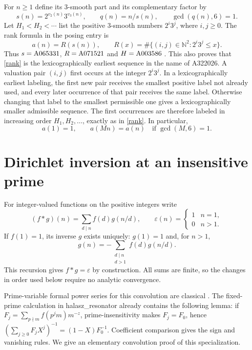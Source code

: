 \documentclass[11pt]{article}
\newcommand{\A}[1]{\textnormal{A#1}}
\newcommand{\N}{\mathbb N}
\begin{document}
For $n\geq1$ define its $3$-smooth part and its complementary factor by
\[
 s(n)=2^{v_2(n)}3^{v_3(n)},\qquad q(n)=n/s(n),\qquad \gcd(q(n),6)=1.
\]
Let $H_1<H_2<\cdots$ list the positive $3$-smooth numbers $2^i3^j$,
where $i,j\geq0$. The rank formula in the posing entry is
\begin{equation}\label{rank}
 a(n)=R(s(n)),\qquad
 R(x)=\#\{(i,j)\in\N^2:2^i3^j\leq x\}.
\end{equation}
Thus $s=\A{065331}$, $R=\A{071521}$ and $H=\A{003586}$
\cite{smoothpart,count,smooth}.
This also proves that \eqref{rank} is the lexicographically earliest
sequence in the name of \A{322026}. A valuation pair $(i,j)$ first
occurs at the integer $2^i3^j$. In a lexicographically earliest labeling,
the first new pair receives the smallest positive label not already
used, and every later occurrence of that pair receives the same label.
Otherwise changing that label to the smallest permissible one gives a
lexicographically smaller admissible sequence. The first occurrences
are therefore labeled in increasing order $H_1,H_2,\ldots$, exactly as
in \eqref{rank}. In particular,
\begin{equation}\label{invariance}
 a(1)=1,\qquad a(Mn)=a(n)\quad\text{if }\gcd(M,6)=1.
\end{equation}

\section{Dirichlet inversion at an insensitive prime}
For integer-valued functions on the positive integers write
\[
 (f*g)(n)=\sum_{d\mid n}f(d)g(n/d),\qquad
 \varepsilon(n)=\begin{cases}1&n=1,\\0&n>1.\end{cases}
\]
If $f(1)=1$, its inverse $g$ exists uniquely: $g(1)=1$ and, for $n>1$,
\begin{equation}\label{recurrence}
 g(n)=-\sum_{\substack{d\mid n\\d>1}}f(d)g(n/d).
\end{equation}
This recursion gives $f*g=\varepsilon$ by construction. All sums are
finite, so the changes in order used below require no analytic convergence.

Prime-variable formal power series for this convolution are classical
\cite[Section 14]{cashwell}. The fixed-prime calculation in
halasz\_resonator \cite[Section 3.4, Theorem 4(1), first proof paragraph]{tower}
already contains the following lemma: if
$F_j=\sum_{p\nmid m}f(p^jm)m^{-z}$, prime-insensitivity makes
$F_j=F_0$, hence $(\sum_{j\geq0}F_jX^j)^{-1}=(1-X)F_0^{-1}$.
Coefficient comparison gives the sign and vanishing rules. We give an
elementary convolution proof of this specialization.
\end{document}
